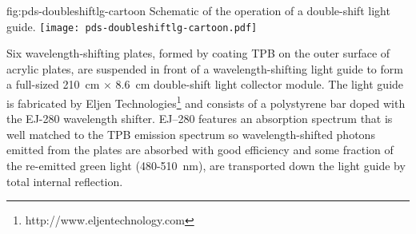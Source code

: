 \begin{dunefigure}{fig:pds-doubleshiftlg-cartoon}
{Schematic of the operation of a double-shift light guide.}
  \texttt{[image: pds-doubleshiftlg-cartoon.pdf]}
\end{dunefigure}


%


Six wavelength-shifting plates, formed by coating TPB on the outer surface of acrylic plates, are suspended in front of a wavelength-shifting light guide to form a full-sized \SI{210}{cm} $\times$ \SI{8.6}{cm} double-shift light collector module. The light guide is fabricated by Eljen Technologies\footnote{http://www.eljentechnology.com} and consists of a polystyrene bar doped with the EJ-280 wavelength shifter. 
EJ--280 features an absorption spectrum that is well matched to the TPB emission spectrum so wavelength-shifted photons emitted from the plates are absorbed with good efficiency and some fraction of the re-emitted green light (480-510~nm), are transported down the light guide by total internal reflection. 



